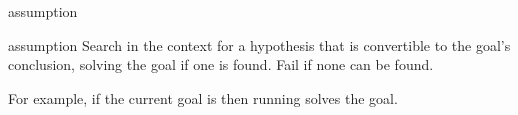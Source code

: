 \begin{tactic}{assumption}
  \begin{tsyntax}[empty]{assumption}
    Search in the context for a hypothesis that is convertible to the
    goal's conclusion, solving the goal if one is found. Fail if none
    can be found.

    For example, if the current goal is
     then
    running
     solves
    the goal.
  \end{tsyntax}
\end{tactic}
